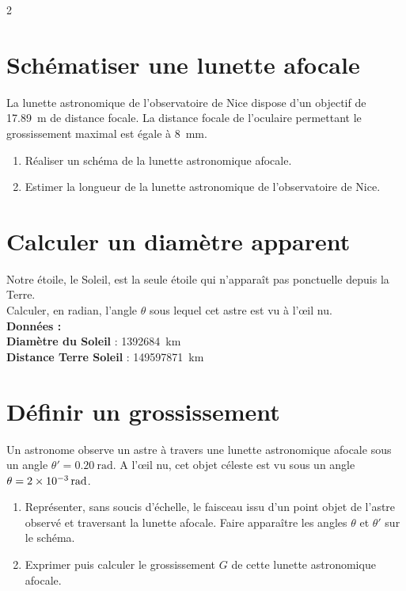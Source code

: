 \documentclass[a4paper,11pt,fleqn]{article}%
\begin{document}
	\maketitle
	
\begin{multicols}{2}
\section{Schématiser une lunette afocale}
La lunette astronomique de l'observatoire de Nice dispose d'un objectif de \SI{17,89}{m} de distance focale. La distance focale de l'oculaire permettant le grossissement maximal est égale à \SI{8}{mm}.
\begin{enumerate}
    \item Réaliser un schéma de la lunette astronomique afocale.
    \item Estimer la longueur de la lunette astronomique de l'observatoire de Nice.
\end{enumerate}

\section{Calculer un diamètre apparent}
Notre étoile, le Soleil, est la seule étoile qui n'apparaît pas ponctuelle depuis la Terre.\\
Calculer, en radian, l'angle $\theta$ sous lequel cet astre est vu à l'\oe il nu.\\
\textbf{Données : }\\
\textbf{Diamètre du Soleil} : \SI{1392684}{km}\\
\textbf{Distance Terre Soleil} : \SI{149 597 871}{km}

\section{Définir un grossissement}
Un astronome observe un astre à travers une lunette astronomique afocale sous un angle $\theta ' = \SI{0,20}{\radian}$. A l'\oe il nu, cet objet céleste est vu sous un angle $\theta = \SI{2E-3}{\radian}$.
\begin{enumerate}
    \item Représenter, sans soucis d'échelle, le faisceau issu d'un point objet de l'astre observé et traversant la lunette afocale. Faire apparaître les angles $\theta$ et $\theta '$ sur le schéma.
    \item Exprimer puis calculer le grossissement $G$ de cette lunette astronomique afocale.
\end{enumerate}


\end{multicols}
\end{document}
